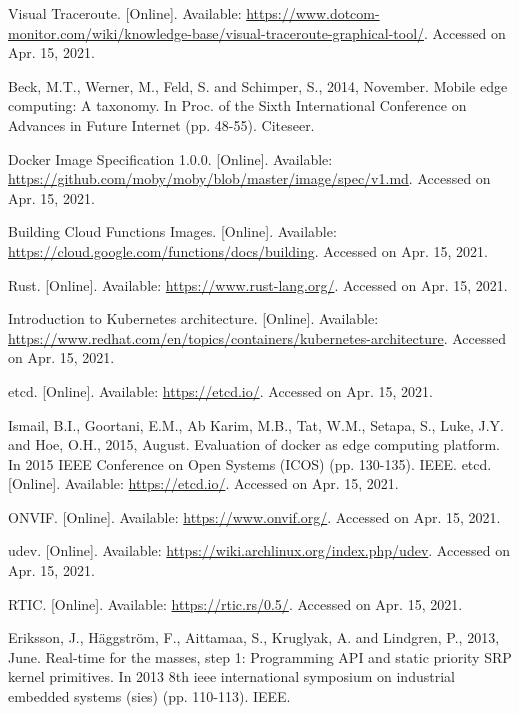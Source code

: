 \begin{thebibliography}{00}
 Visual Traceroute. [Online]. Available: \url{https://www.dotcom-monitor.com/wiki/knowledge-base/visual-traceroute-graphical-tool/}. Accessed on Apr. 15, 2021.

 Beck, M.T., Werner, M., Feld, S. and Schimper, S., 2014, November. Mobile edge computing: A taxonomy. In Proc. of the Sixth International Conference on Advances in Future Internet (pp. 48-55). Citeseer.

 Docker Image Specification 1.0.0. [Online]. Available: \url{https://github.com/moby/moby/blob/master/image/spec/v1.md}. Accessed on Apr. 15, 2021.

 Building Cloud Functions Images. [Online]. Available: \url{https://cloud.google.com/functions/docs/building}. Accessed on Apr. 15, 2021.

 Rust. [Online]. Available: \url{https://www.rust-lang.org/}. Accessed on Apr. 15, 2021.

 Introduction to Kubernetes architecture. [Online]. Available: \url{https://www.redhat.com/en/topics/containers/kubernetes-architecture}. Accessed on Apr. 15, 2021.

 etcd. [Online]. Available: \url{https://etcd.io/}. Accessed on Apr. 15, 2021.

 Ismail, B.I., Goortani, E.M., Ab Karim, M.B., Tat, W.M., Setapa, S., Luke, J.Y. and Hoe, O.H., 2015, August. Evaluation of docker as edge computing platform. In 2015 IEEE Conference on Open Systems (ICOS) (pp. 130-135). IEEE.
 etcd. [Online]. Available: \url{https://etcd.io/}. Accessed on Apr. 15, 2021.

 ONVIF. [Online]. Available: \url{https://www.onvif.org/}. Accessed on Apr. 15, 2021.

 udev. [Online]. Available: \url{https://wiki.archlinux.org/index.php/udev}. Accessed on Apr. 15, 2021.

 RTIC. [Online]. Available: \url{https://rtic.rs/0.5/}. Accessed on Apr. 15, 2021.

 Eriksson, J., Häggström, F., Aittamaa, S., Kruglyak, A. and Lindgren, P., 2013, June. Real-time for the masses, step 1: Programming API and static priority SRP kernel primitives. In 2013 8th ieee international symposium on industrial embedded systems (sies) (pp. 110-113). IEEE.

\end{thebibliography}
